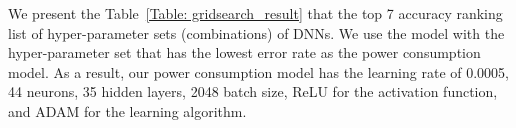 \documentclass[journal]{./template/IEEEtran}
\begin{document}
\begin{table}[ht]
\caption{The list of grid search results}
\label{Table: gridsearch_result}
\end{table}

We present the Table~\ref{Table: gridsearch_result} that the top 7 accuracy ranking list of hyper-parameter sets (combinations) of DNNs.
We use the model with the hyper-parameter set that has the lowest error rate as the power consumption model. 
As a result, our power consumption model has the learning rate of 0.0005, 44 neurons, 35 hidden layers, 2048 batch size, ReLU for the activation function, and ADAM for the learning algorithm. 

\end{document}

